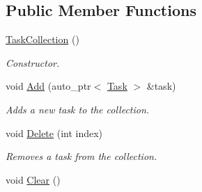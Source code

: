 \subsection*{Public Member Functions}
\begin{DoxyCompactItemize}
\item 
\hypertarget{class_task_collection_a593ef694d38b929f49707a30233e0555}{\hyperlink{class_task_collection_a593ef694d38b929f49707a30233e0555}{Task\-Collection} ()}\label{class_task_collection_a593ef694d38b929f49707a30233e0555}

\begin{DoxyCompactList}\small\item\em Constructor. \end{DoxyCompactList}\item 
void \hyperlink{class_task_collection_aba9ab69e1dc0d92eae5a49dd2878466d}{Add} (auto\-\_\-ptr$<$ \hyperlink{class_task}{Task} $>$ \&task)
\begin{DoxyCompactList}\small\item\em Adds a new task to the collection. \end{DoxyCompactList}\item 
void \hyperlink{class_task_collection_a8cb3410c9f8283b8297ec47588a34bb9}{Delete} (int index)
\begin{DoxyCompactList}\small\item\em Removes a task from the collection. \end{DoxyCompactList}\item 
\hypertarget{class_task_collection_ac07e8ebd5d073ab9d630b65fff593266}{void \hyperlink{class_task_collection_ac07e8ebd5d073ab9d630b65fff593266}{Clear} ()}\label{class_task_collection_ac07e8ebd5d073ab9d630b65fff593266}


\end{DoxyCompactItemize}
